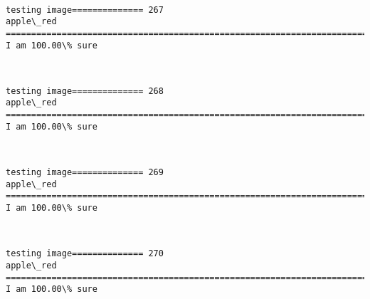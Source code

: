 \documentclass[11pt]{article}
\begin{document}
    \begin{center}
    \end{center}
    { \hspace*{\fill} \\}
    
    \begin{Verbatim}[commandchars=\\\{\}]
testing image============== 267
apple\_red
============================================================================
I am 100.00\% sure

    \end{Verbatim}

    \begin{center}
    \end{center}
    { \hspace*{\fill} \\}
    
    \begin{Verbatim}[commandchars=\\\{\}]
testing image============== 268
apple\_red
============================================================================
I am 100.00\% sure

    \end{Verbatim}

    \begin{center}
    \end{center}
    { \hspace*{\fill} \\}
    
    \begin{Verbatim}[commandchars=\\\{\}]
testing image============== 269
apple\_red
============================================================================
I am 100.00\% sure

    \end{Verbatim}

    \begin{center}
    \end{center}
    { \hspace*{\fill} \\}
    
    \begin{Verbatim}[commandchars=\\\{\}]
testing image============== 270
apple\_red
============================================================================
I am 100.00\% sure

    \end{Verbatim}
\end{document}
